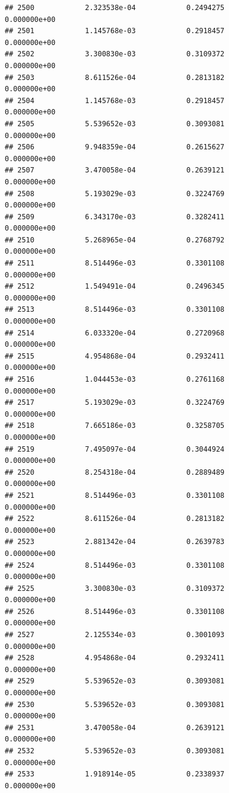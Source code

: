 \documentclass[
]{article}
\begin{document}
\begin{verbatim}
## 2500            2.323538e-04            0.2494275            0.000000e+00
## 2501            1.145768e-03            0.2918457            0.000000e+00
## 2502            3.300830e-03            0.3109372            0.000000e+00
## 2503            8.611526e-04            0.2813182            0.000000e+00
## 2504            1.145768e-03            0.2918457            0.000000e+00
## 2505            5.539652e-03            0.3093081            0.000000e+00
## 2506            9.948359e-04            0.2615627            0.000000e+00
## 2507            3.470058e-04            0.2639121            0.000000e+00
## 2508            5.193029e-03            0.3224769            0.000000e+00
## 2509            6.343170e-03            0.3282411            0.000000e+00
## 2510            5.268965e-04            0.2768792            0.000000e+00
## 2511            8.514496e-03            0.3301108            0.000000e+00
## 2512            1.549491e-04            0.2496345            0.000000e+00
## 2513            8.514496e-03            0.3301108            0.000000e+00
## 2514            6.033320e-04            0.2720968            0.000000e+00
## 2515            4.954868e-04            0.2932411            0.000000e+00
## 2516            1.044453e-03            0.2761168            0.000000e+00
## 2517            5.193029e-03            0.3224769            0.000000e+00
## 2518            7.665186e-03            0.3258705            0.000000e+00
## 2519            7.495097e-04            0.3044924            0.000000e+00
## 2520            8.254318e-04            0.2889489            0.000000e+00
## 2521            8.514496e-03            0.3301108            0.000000e+00
## 2522            8.611526e-04            0.2813182            0.000000e+00
## 2523            2.881342e-04            0.2639783            0.000000e+00
## 2524            8.514496e-03            0.3301108            0.000000e+00
## 2525            3.300830e-03            0.3109372            0.000000e+00
## 2526            8.514496e-03            0.3301108            0.000000e+00
## 2527            2.125534e-03            0.3001093            0.000000e+00
## 2528            4.954868e-04            0.2932411            0.000000e+00
## 2529            5.539652e-03            0.3093081            0.000000e+00
## 2530            5.539652e-03            0.3093081            0.000000e+00
## 2531            3.470058e-04            0.2639121            0.000000e+00
## 2532            5.539652e-03            0.3093081            0.000000e+00
## 2533            1.918914e-05            0.2338937            0.000000e+00

\end{verbatim}
\end{document}
